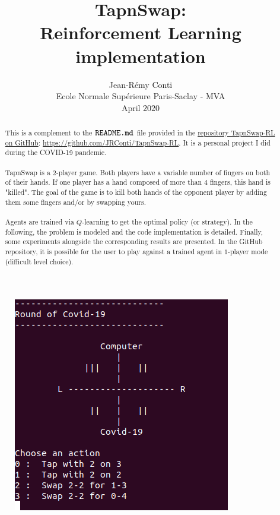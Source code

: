 \documentclass{article}
\title{TapnSwap:\\Reinforcement Learning implementation}
\author{Jean-Rémy Conti\\Ecole Normale Supérieure Paris-Saclay - MVA\\April $2020$}
\begin{document}
\maketitle

\begin{abstract}
This is a complement to the $\verb|README.md|$ file provided in the \href{https://github.com/JRConti/TapnSwap-RL}{repository TapnSwap-RL on GitHub}: \url{https://github.com/JRConti/TapnSwap-RL}. It is a personal project I did during the COVID-19 pandemic.\\ \\ TapnSwap is a $2$-player game. Both players have a variable number of fingers on both of their hands. If one player has a hand composed of more than $4$ fingers, this hand is "killed". The goal of the game is to kill both hands of the opponent player by adding them some fingers and/or by swapping yours.\\ \\
Agents are trained via $Q$-learning to get the optimal policy (or strategy). In the following, the problem is modeled and the code implementation is detailed. Finally, some experiments alongside the corresponding results are presented. In the GitHub repository, it is possible for the user to play against a trained agent in $1$-player mode (difficult level choice).
\end{abstract}

\vspace{2\baselineskip}

\begin{figure}[h]
    \centering
    \includegraphics[scale = 0.6]{img/preview.png}
\end{figure}{}
\end{document}
